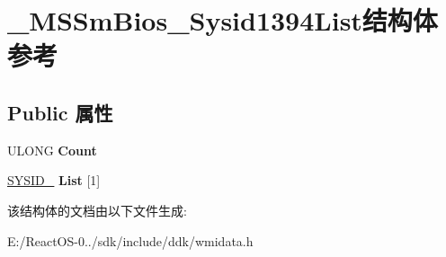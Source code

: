 \hypertarget{struct___m_s_sm_bios___sysid1394_list}{}\section{\+\_\+\+M\+S\+Sm\+Bios\+\_\+\+Sysid1394\+List结构体 参考}
\label{struct___m_s_sm_bios___sysid1394_list}
\subsection*{Public 属性}
\begin{DoxyCompactItemize}
\item 
\mbox{\label{struct___m_s_sm_bios___sysid1394_list_a2423e8fe8c578c6633f441098776d307}} 
U\+L\+O\+NG {\bfseries Count}
\item 
\mbox{\label{struct___m_s_sm_bios___sysid1394_list_a4510766b469bd1cff5adf5f1a4e25094}} 
\hyperlink{struct___s_y_s_i_d__1394}{S\+Y\+S\+I\+D\+\_} {\bfseries List} \mbox{[}1\mbox{]}
\end{DoxyCompactItemize}


该结构体的文档由以下文件生成\+:\begin{DoxyCompactItemize}
\item 
E\+:/\+React\+O\+S-\/0../sdk/include/ddk/wmidata.\+h\end{DoxyCompactItemize}
